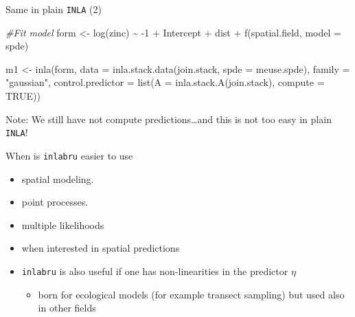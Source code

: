 \documentclass[
  ignorenonframetext,
]{beamer}
\newenvironment{Shaded}{\begin{snugshade}}{\end{snugshade}}
\newcommand{\AttributeTok}[1]{\textcolor[rgb]{0.77,0.63,0.00}{#1}}
\newcommand{\CommentTok}[1]{\textcolor[rgb]{0.56,0.35,0.01}{\textit{#1}}}
\newcommand{\ConstantTok}[1]{\textcolor[rgb]{0.00,0.00,0.00}{#1}}
\newcommand{\DecValTok}[1]{\textcolor[rgb]{0.00,0.00,0.81}{#1}}
\newcommand{\FunctionTok}[1]{\textcolor[rgb]{0.00,0.00,0.00}{#1}}
\newcommand{\NormalTok}[1]{#1}
\newcommand{\OtherTok}[1]{\textcolor[rgb]{0.56,0.35,0.01}{#1}}
\newcommand{\SpecialCharTok}[1]{\textcolor[rgb]{0.00,0.00,0.00}{#1}}
\newcommand{\StringTok}[1]{\textcolor[rgb]{0.31,0.60,0.02}{#1}}
\providecommand{\tightlist}{%
  \setlength{\itemsep}{0pt}\setlength{\parskip}{0pt}}
\begin{document}
\begin{frame}[fragile]{Same in plain \texttt{INLA} (2)}
\protect\hypertarget{same-in-plain-inla-2}{}
\tiny

\begin{Shaded}
\begin{Highlighting}[]
\CommentTok{\#Fit model}
\NormalTok{form }\OtherTok{\textless{}{-}} \FunctionTok{log}\NormalTok{(zinc) }\SpecialCharTok{\textasciitilde{}} \SpecialCharTok{{-}}\DecValTok{1} \SpecialCharTok{+}\NormalTok{ Intercept }\SpecialCharTok{+}\NormalTok{ dist }\SpecialCharTok{+} \FunctionTok{f}\NormalTok{(spatial.field, }\AttributeTok{model =}\NormalTok{ spde)}

\NormalTok{m1 }\OtherTok{\textless{}{-}} \FunctionTok{inla}\NormalTok{(form, }\AttributeTok{data =} \FunctionTok{inla.stack.data}\NormalTok{(join.stack, }\AttributeTok{spde =}\NormalTok{ meuse.spde),}
  \AttributeTok{family =} \StringTok{"gaussian"}\NormalTok{,}
  \AttributeTok{control.predictor =} \FunctionTok{list}\NormalTok{(}\AttributeTok{A =} \FunctionTok{inla.stack.A}\NormalTok{(join.stack), }\AttributeTok{compute =} \ConstantTok{TRUE}\NormalTok{))}
\end{Highlighting}
\end{Shaded}

Note: We still have not compute predictions\ldots and this is not too
easy in plain \texttt{INLA}!
\end{frame}

\begin{frame}[fragile]{When is \texttt{inlabru} easier to use}
\protect\hypertarget{when-is-inlabru-easier-to-use}{}
\begin{itemize}
\item
  spatial modeling.
\item
  point processes.
\item
  multiple likelihoods
\item
  when interested in spatial predictions
\end{itemize}

\pause

\begin{itemize}
\item
  \texttt{inlabru} is also useful if one has non-linearities in the
  predictor \(\eta\)

  \begin{itemize}
  \tightlist
  \item
    born for ecological models (for example transect sampling) but used
    also in other fields
  \end{itemize}
\end{itemize}
\end{frame}
\end{document}

